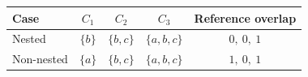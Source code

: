 \begingroup
\small\setlength{\tabcolsep}{7pt}
\begin{tabular}{@{}lcccc@{}}
\toprule
Case & $C_1$ & $C_2$ & $C_3$ & Reference overlap \\
\midrule
Nested & $\{b\}$ & $\{b,c\}$ & $\{a,b,c\}$ & $0,\ 0,\ 1$ \\
Non-nested & $\{a\}$ & $\{b,c\}$ & $\{a,b,c\}$ & $1,\ 0,\ 1$ \\
\bottomrule
\end{tabular}
\endgroup
